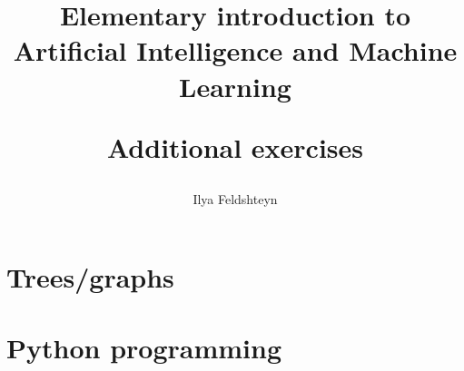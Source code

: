 \documentclass[12pt,oneside]{book}
\title{Elementary introduction to Artificial Intelligence and
Machine Learning

Additional exercises}
\author{Ilya Feldshteyn}
\begin{document}
\maketitle
\tableofcontents{}



\section{Trees/graphs}





\section{Python programming}
\end{document}
